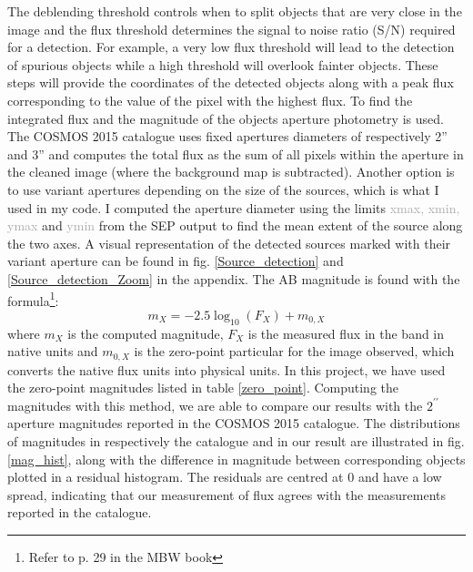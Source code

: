 The deblending threshold controls when to split objects that are very close in the image and the flux threshold determines the signal to noise ratio (S/N) required for a detection. For example, a very low flux threshold will lead to the detection of spurious objects while a high threshold will overlook fainter objects. These steps will provide the coordinates of the detected objects along with a peak flux corresponding  to the value of the pixel with the highest flux. To find the integrated flux and the magnitude of the objects aperture photometry is used. The COSMOS 2015 catalogue uses fixed apertures diameters of respectively 2'' and 3'' and computes the total flux as the sum of all pixels within the aperture in the cleaned image (where the background map is subtracted). Another option is to use variant apertures depending on the size of the sources, which is what I used in my code. I computed the aperture diameter using the limits \textcolor{darkgray}{xmax, xmin, ymax} and \textcolor{darkgray}{ymin} from the SEP output to find the mean extent of the source along the two axes. A visual representation of the detected sources marked with their variant aperture can be found in fig. \ref{Source_detection} and \ref{Source_detection_Zoom} in the appendix. The AB magnitude is found with the formula\footnote{Refer to p. 29 in the MBW book}:
\begin{equation}
    m_X = -2.5\log_{10}(F_X) + m_{0,X}
\end{equation}
where $m_X$ is the computed magnitude, $F_X$ is the measured flux in the band in native units and $m_{0,X}$ is the zero-point particular for the image observed, which converts the native flux units into physical units. In this project, we have used the zero-point magnitudes listed in table \ref{zero_point}. Computing the magnitudes with this method, we are able to compare our results with the $2^{\prime\prime}$ aperture magnitudes reported in the COSMOS 2015 catalogue. The distributions of magnitudes in respectively the catalogue and in our result are illustrated in fig.\ref{mag_hist}, along with the difference in magnitude between corresponding objects plotted in a residual histogram. The residuals are centred at 0 and have a low spread, indicating that our measurement of flux agrees with the measurements reported in the catalogue.
